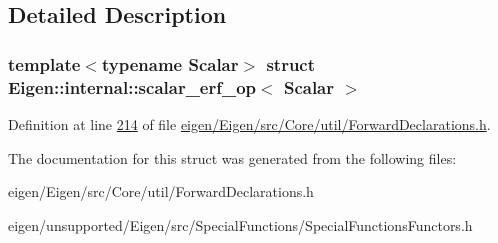 \subsection{Detailed Description}
\subsubsection*{template$<$typename Scalar$>$\newline
struct Eigen\+::internal\+::scalar\+\_\+erf\+\_\+op$<$ Scalar $>$}



Definition at line \hyperlink{eigen_2_eigen_2src_2_core_2util_2_forward_declarations_8h_source_l00214}{214} of file \hyperlink{eigen_2_eigen_2src_2_core_2util_2_forward_declarations_8h_source}{eigen/\+Eigen/src/\+Core/util/\+Forward\+Declarations.\+h}.



The documentation for this struct was generated from the following files\+:\begin{DoxyCompactItemize}
\item 
eigen/\+Eigen/src/\+Core/util/\+Forward\+Declarations.\+h\item 
eigen/unsupported/\+Eigen/src/\+Special\+Functions/\+Special\+Functions\+Functors.\+h\end{DoxyCompactItemize}
